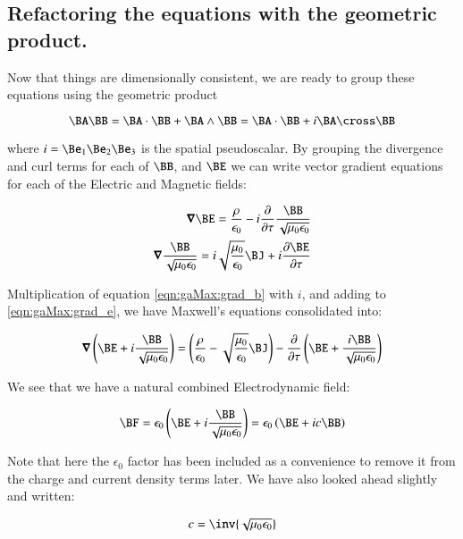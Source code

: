 \subsection{Refactoring the equations with the geometric product. }

Now that things are dimensionally consistent, we are ready to group these equations using the geometric product

\begin{equation}
\BA \BB = \BA \cdot \BB + \BA \wedge \BB = \BA \cdot \BB + i \BA \cross \BB
\end{equation}

where $i = \Be_1\Be_2\Be_3$ is the spatial pseudoscalar.  By grouping the divergence and curl terms for each of $\BB$, and $\BE$ we can write vector gradient equations
for each of the Electric and Magnetic fields:

\begin{align}
\spacegrad \BE = \frac{\rho}{\epsilon_0} - i \frac{\partial}{\partial \tau} \frac{\BB}{\sqrt{\mu_0\epsilon_0}} \label{eqn:gaMax:grad_e} \\
\spacegrad \frac{\BB}{\sqrt{\mu_0\epsilon_0}} = i\sqrt{\frac{\mu_0}{\epsilon_0}} \BJ + i\frac{\partial \BE}{\partial \tau} \label{eqn:gaMax:grad_b}
\end{align}

Multiplication of equation \ref{eqn:gaMax:grad_b} with $i$, and adding to \ref{eqn:gaMax:grad_e}, we have Maxwell's equations consolidated into:

\begin{equation}\label{eqn:gaMax:maxwelleb}
\spacegrad \left(\BE + i \frac{\BB}{\sqrt{\mu_0\epsilon_0}}\right) =
\left(\frac{\rho}{\epsilon_0} - \sqrt{\frac{\mu_0}{\epsilon_0}} \BJ\right)
- \frac{\partial}{\partial \tau} \left(\BE + \frac{i\BB}{\sqrt{\mu_0\epsilon_0}} \right)
\end{equation}

We see that we have a natural combined Electrodynamic field:

\begin{equation}
\BF = \epsilon_0\left(\BE + i \frac{\BB}{\sqrt{\mu_0\epsilon_0}}\right) = \epsilon_0\left(\BE + i c \BB\right)
\end{equation}

Note that here the $\epsilon_0$ factor has been included as a convenience to remove it from the charge and current density terms later.  We have also looked ahead slightly and written:

\begin{equation}
c = \inv{\sqrt{\mu_0\epsilon_0}}
\end{equation}

